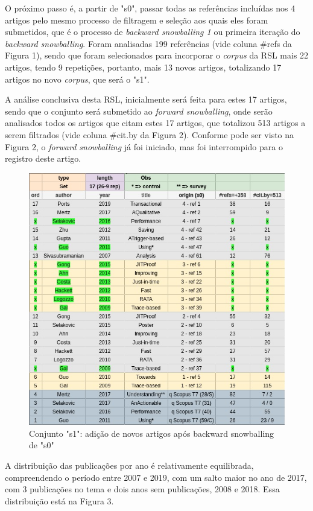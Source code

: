 \documentclass[sigconf]{acmart}
\begin{document}
O próximo passo é, a partir de "s0", passar todas as referências incluídas nos 4 artigos pelo mesmo processo de filtragem e seleção aos quais eles foram submetidos, que é o processo de \textit{backward snowballing 1} ou primeira iteração do \textit{backward snowballing}. Foram analisadas 199 referências (vide coluna \#refs da Figura 1), sendo que foram selecionados para incorporar o \textit{corpus} da RSL mais 22 artigos, tendo 9 repetições, portanto, mais 13 novos artigos, totalizando 17 artigos no novo \textit{corpus}, que será o "s1".

A análise conclusiva desta RSL, inicialmente será feita para estes 17 artigos, sendo que o conjunto será submetido ao \textit{forward snowballing}, onde serão analisados todos os artigos que citam estes 17 artigos, que totalizou 513 artigos a serem filtrados (vide coluna \#cit.by da Figura 2). Conforme pode ser visto na Figura 2, o \textit{forward snowballing} já foi iniciado, mas foi interrompido para o registro deste artigo.

\begin{figure}[H]
  \centering
  \includegraphics[width=\linewidth]{s1}
  \caption{Conjunto "s1": adição de novos artigos após backward snowballing de "s0"}
\end{figure}

A distribuição das publicações por ano é relativamente equilibrada, compreendendo o período entre 2007 e 2019, com um salto maior no ano de 2017, com 3 publicações no tema e dois anos sem publicações, 2008 e 2018. Essa distribuição está na Figura 3.
\end{document}
